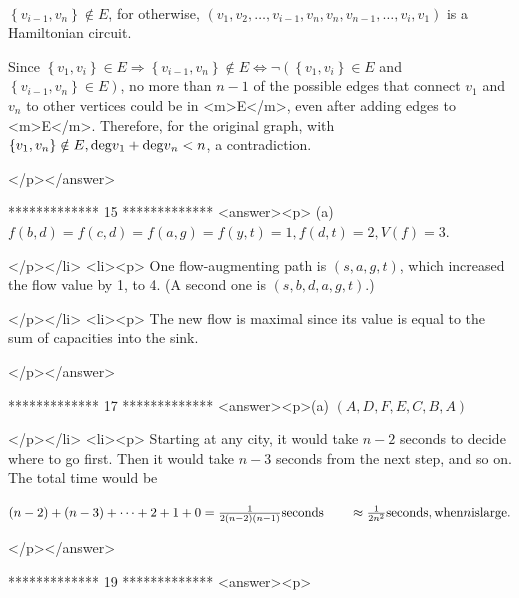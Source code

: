 \begin{doublespace}
\noindent\(\pmb{}\)
\end{doublespace}



\(\left\{v_{i-1},v_n\right\}\notin E\), for otherwise, \(\left(v_1,v_2,\ldots ,v_{i-1},v_n,v_n,v_{n-1},\ldots ,v_i,v_1\right)\) is a Hamiltonian
circuit.



Since \(\left\{v_1,v_i\right\}\in E\Rightarrow \left\{v_{i-1},v_n\right\}\notin E\Leftrightarrow \neg \left(\left\{v_1,v_i\right\}\in E\right.\)
and \(\left.\left\{v_{i-1},v_n\right\}\in E\right)\), no more than \(n-1\) of the possible edges that connect \(v_1\) and \(v_n\) to other vertices
could be in <m>E</m>, even after adding edges to <m>E</m>. Therefore, for the original graph, with \(\left\{v_1,v_n\right\}\notin E, \text{\textit{$\deg
$}} \text{\textit{$v$}}_1+\text{\textit{$\deg $}}\text{\textit{$ $}}\text{\textit{$v$}}_{n }<n\), a contradiction.

</p></answer>


*************
15
*************
<answer><p> (a)  \(f(b,d)=f(c,d)=f(a,g)=f(y,t)=1, f(d,t)=2, V(f)=3\).

</p></li>
<li><p> One flow-augmenting path is \((s,a,g,t)\), which increased the flow value by 1, to 4. (A second one is \((s,b,d,a,g,t)\).)

</p></li>
<li><p>  The new flow is maximal since its value is equal to the sum of capacities into the sink.

</p></answer>


*************
17
*************
<answer><p>(a) \((A,D,F,E,C,B,A)\)

</p></li>
<li><p> Starting at any city, it would take \(n-2\) seconds to decide where to go first. Then it would take \(n-3\) seconds from the next step, and so
on. The total time would be



\((n-2)+(n-3)+\cdots +2+1+0=\frac{1}{2(n-2)(n-1)} \text{seconds}\\
\\
\quad \quad \approx \frac{1}{2n^2}\text{seconds}, \text{when} n \text{is} \text{large}.\)

</p></answer>


*************
19
*************
<answer><p>

\begin{doublespace}
\noindent\(\)
\end{doublespace}

\begin{doublespace}
\noindent\(\)
\end{doublespace}



